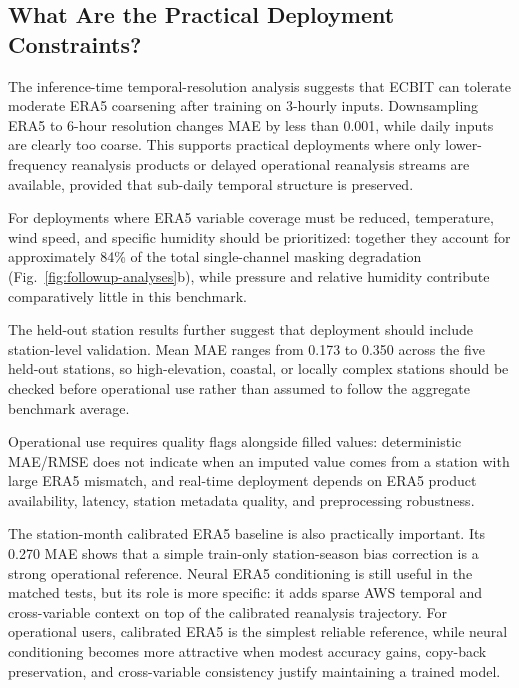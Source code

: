 \subsection{What Are the Practical Deployment Constraints?}
The inference-time temporal-resolution analysis suggests that ECBIT can tolerate moderate ERA5 coarsening after training on 3-hourly inputs. Downsampling ERA5 to 6-hour resolution changes MAE by less than 0.001, while daily inputs are clearly too coarse. This supports practical deployments where only lower-frequency reanalysis products or delayed operational reanalysis streams are available, provided that sub-daily temporal structure is preserved.

For deployments where ERA5 variable coverage must be reduced, temperature, wind speed, and specific humidity should be prioritized: together they account for approximately 84\% of the total single-channel masking degradation (Fig.~\ref{fig:followup-analyses}b), while pressure and relative humidity contribute comparatively little in this benchmark.

The held-out station results further suggest that deployment should include station-level validation. Mean MAE ranges from 0.173 to 0.350 across the five held-out stations, so high-elevation, coastal, or locally complex stations should be checked before operational use rather than assumed to follow the aggregate benchmark average.

Operational use requires quality flags alongside filled values: deterministic MAE/RMSE does not indicate when an imputed value comes from a station with large ERA5 mismatch, and real-time deployment depends on ERA5 product availability, latency, station metadata quality, and preprocessing robustness.

The station-month calibrated ERA5 baseline is also practically important. Its 0.270 MAE shows that a simple train-only station-season bias correction is a strong operational reference. Neural ERA5 conditioning is still useful in the matched tests, but its role is more specific: it adds sparse AWS temporal and cross-variable context on top of the calibrated reanalysis trajectory. For operational users, calibrated ERA5 is the simplest reliable reference, while neural conditioning becomes more attractive when modest accuracy gains, copy-back preservation, and cross-variable consistency justify maintaining a trained model.

